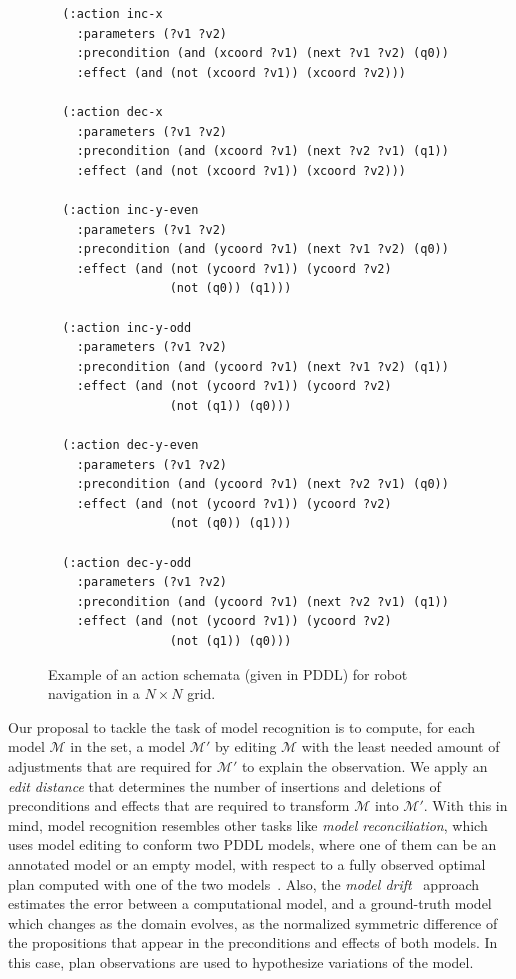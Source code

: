\documentclass[letterpaper]{article} %
\begin{document}
\begin{figure}
  \begin{tiny}
  \begin{verbatim}
  (:action inc-x
    :parameters (?v1 ?v2)
    :precondition (and (xcoord ?v1) (next ?v1 ?v2) (q0))
    :effect (and (not (xcoord ?v1)) (xcoord ?v2)))

  (:action dec-x
    :parameters (?v1 ?v2)
    :precondition (and (xcoord ?v1) (next ?v2 ?v1) (q1))
    :effect (and (not (xcoord ?v1)) (xcoord ?v2)))

  (:action inc-y-even
    :parameters (?v1 ?v2)
    :precondition (and (ycoord ?v1) (next ?v1 ?v2) (q0))
    :effect (and (not (ycoord ?v1)) (ycoord ?v2)
                 (not (q0)) (q1)))

  (:action inc-y-odd
    :parameters (?v1 ?v2)
    :precondition (and (ycoord ?v1) (next ?v1 ?v2) (q1))
    :effect (and (not (ycoord ?v1)) (ycoord ?v2)
                 (not (q1)) (q0)))

  (:action dec-y-even
    :parameters (?v1 ?v2)
    :precondition (and (ycoord ?v1) (next ?v2 ?v1) (q0))
    :effect (and (not (ycoord ?v1)) (ycoord ?v2)
                 (not (q0)) (q1)))

  (:action dec-y-odd
    :parameters (?v1 ?v2)
    :precondition (and (ycoord ?v1) (next ?v2 ?v1) (q1))
    :effect (and (not (ycoord ?v1)) (ycoord ?v2)
                 (not (q1)) (q0)))
  \end{verbatim}
  \end{tiny}
 \caption{Example of an action schemata (given in PDDL) for robot navigation in a $N\times N$ grid.}
   \label{fig:model-example}
\end{figure}


Our proposal to tackle the task of model recognition is to compute, for each model $\mathcal{M}$ in the set, a model $\mathcal{M'}$ by editing $\mathcal{M}$ with the least needed amount of adjustments that are required for $\mathcal{M'}$ to explain the observation. We apply an \emph{edit distance} that determines the number of insertions and deletions of preconditions and effects that are required to transform $\mathcal{M}$ into $\mathcal{M'}$. With this in mind, model recognition resembles other tasks like \emph{model reconciliation}, which uses model editing to conform two PDDL models, where one of them can be an annotated model or an empty model, with respect to a fully observed optimal plan computed with one of the two models~\cite{ChakrabortiSZK17,sreedharan2018handling,Chakraborti18}. Also, the \emph{model drift}~\cite{BryceBB16} approach estimates the error between a computational model, and a ground-truth model which changes as the domain evolves, as the normalized symmetric difference of the propositions that appear in the preconditions and effects of both models. In this case, plan observations are used to hypothesize variations of the model.
\end{document}
